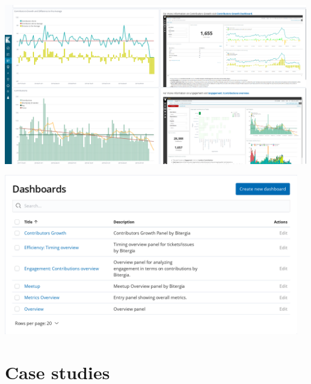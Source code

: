 \documentclass[17pt,aspectratio=169,hyperref=pdfusetitle]{beamer}
\begin{document}
\begin{frame}

\begin{center}
\includegraphics[height=7cm]{figs/cauldron-kibana}
\end{center}

\end{frame}


\begin{frame}

\begin{center}
\includegraphics[height=7cm]{figs/cauldron-kibana-2}
\end{center}

\end{frame}

\section{Case studies}
\end{document}
